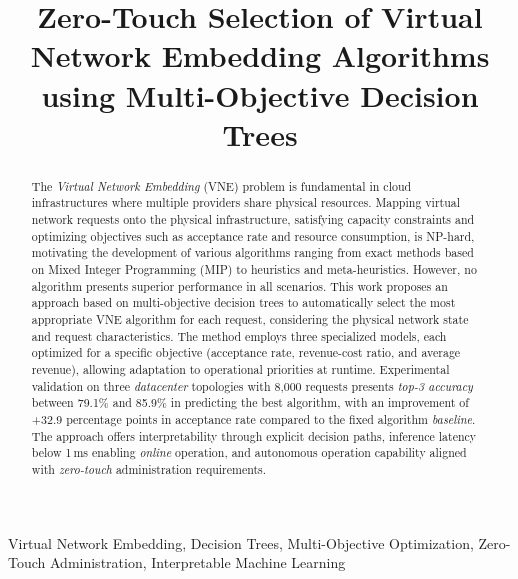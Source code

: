 \documentclass[conference]{IEEEtran}
\begin{document}
\title{Zero-Touch Selection of Virtual Network Embedding Algorithms using Multi-Objective Decision Trees}

\author{
}

\maketitle

\begin{abstract}
The \textit{Virtual Network Embedding} (VNE) problem is fundamental in cloud infrastructures where multiple providers share physical resources. Mapping virtual network requests onto the physical infrastructure, satisfying capacity constraints and optimizing objectives such as acceptance rate and resource consumption, is NP-hard, motivating the development of various algorithms ranging from exact methods based on Mixed Integer Programming (MIP) to heuristics and meta-heuristics. However, no algorithm presents superior performance in all scenarios. This work proposes an approach based on multi-objective decision trees to automatically select the most appropriate VNE algorithm for each request, considering the physical network state and request characteristics. The method employs three specialized models, each optimized for a specific objective (acceptance rate, revenue-cost ratio, and average revenue), allowing adaptation to operational priorities at runtime. Experimental validation on three \textit{datacenter} topologies with 8,000 requests presents \textit{top-3 accuracy} between 79.1\% and 85.9\% in predicting the best algorithm, with an improvement of +32.9 percentage points in acceptance rate compared to the fixed algorithm \textit{baseline}. The approach offers interpretability through explicit decision paths, inference latency below 1\,ms enabling \textit{online} operation, and autonomous operation capability aligned with \textit{zero-touch} administration requirements.
\end{abstract}

\begin{IEEEkeywords}
Virtual Network Embedding, Decision Trees, Multi-Objective Optimization, Zero-Touch Administration, Interpretable Machine Learning
\end{IEEEkeywords}
\end{document}
